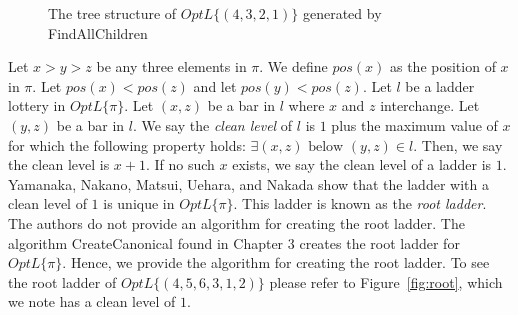 \begin{figure}[h]
	\caption{The tree structure of $OptL\{(4,3,2,1)\}$ generated by {\sc FindAllChildren}}
	\label{Fig:TreeFAC}
\end{figure}
\pagebreak
Let $x>y>z$ be any three elements in $\pi$. We define 
$pos(x)$ as the position of $x$ in $\pi$.
Let $pos(x) < pos(z)$ and let $pos(y) < pos(z)$. 
Let $l$ be a ladder lottery in $OptL\{\pi\}$. 
Let $(x,z)$ be a bar in $l$ where $x$ and $z$ interchange. Let $(y,z)$ 
be a bar in $l$. We say the \emph{clean level} of $l$ is $1$ 
plus the maximum value of $x$ for which the following property holds: $\exists (x,z) \text{ below } (y,z) \in l$. 
Then, we say the clean level is $x+1$. If no such $x$ exists, we say the clean level of a ladder is $1$. 
Yamanaka, Nakano, Matsui, Uehara, and Nakada show that the ladder with a clean level of $1$ is unique in $OptL\{\pi\}$. This ladder 
is known as the \emph{root ladder}. The authors do not provide an algorithm for creating the root ladder. 
The algorithm {\sc CreateCanonical} found in Chapter 3 creates the root ladder for $OptL\{\pi\}$. 
Hence, we provide the algorithm for creating the root ladder.
To see the root ladder of $OptL\{(4,5,6,3,1,2)\}$ please refer to Figure~\ref{fig:root}, which we note has a clean level of $1$.  

